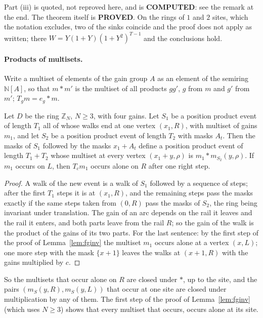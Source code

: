 Part (iii) is quoted, not reproved here, and is \textbf{COMPUTED}: see the remark at the end. The theorem itself is \textbf{PROVED}. On the rings of $1$ and $2$ sites, which the notation excludes, two of the sinks coincide and the proof does not apply as written; there $W=Y(1+Y)(1+Y^{2})^{T-1}$ and the conclusions hold.

\paragraph{Products of multisets.} Write a multiset of elements of the gain group $A$ as an element of the semiring $\mathbb{N}[A]$, so that $m*m'$ is the multiset of all products $gg'$, $g$ from $m$ and $g'$ from $m'$; $T_g m=e_g*m$.

\begin{lemma}\label{lem:twist}
Let $D$ be the ring $\mathbb{Z}_N$, $N\ge3$, with four gains. Let $S_1$ be a position product event of length $T_1$ all of whose walks end at one vertex $(x_1,R)$, with multiset of gains $m_1$, and let $S_2$ be a position product event of length $T_2$ with masks $A_t$. Then the masks of $S_1$ followed by the masks $x_1+A_t$ define a position product event of length $T_1+T_2$ whose multiset at every vertex $(x_1+y,\rho)$ is $m_1*m_{S_2}(y,\rho)$. If $m_1$ occurs on $L$, then $T_cm_1$ occurs alone on $R$ after one right step.
\end{lemma}
\begin{proof}
A walk of the new event is a walk of $S_1$ followed by a sequence of steps; after the first $T_1$ steps it is at $(x_1,R)$, and the remaining steps pass the masks exactly if the same steps taken from $(0,R)$ pass the masks of $S_2$, the ring being invariant under translation. The gain of an arc depends on the rail it leaves and the rail it enters, and both parts leave from the rail $R$; so the gain of the walk is the product of the gains of its two parts. For the last sentence: by the first step of the proof of Lemma~\ref{lem:fginv} the multiset $m_1$ occurs alone at a vertex $(x,L)$; one more step with the mask $\{x+1\}$ leaves the walks at $(x+1,R)$ with the gains multiplied by $c$.
\end{proof}

So the multisets that occur alone on $R$ are closed under $*$, up to the site, and the pairs $(m_S(y,R),m_S(y,L))$ that occur at one site are closed under multiplication by any of them. The first step of the proof of Lemma~\ref{lem:fginv} (which uses $N\ge3$) shows that every multiset that occurs, occurs alone at its site.

